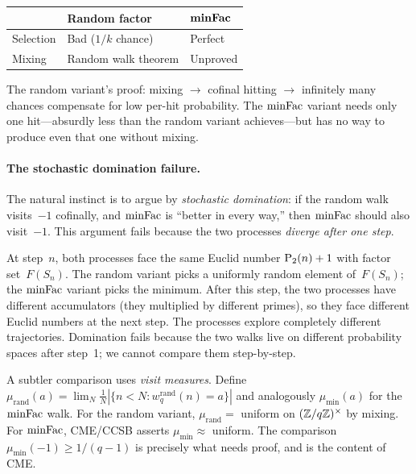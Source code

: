 \smallskip
\begin{center}
\begin{tabular}{l@{\quad}l@{\quad}l}
\toprule
 & \textbf{Random factor} & $\boldsymbol{\mathrm{minFac}}$ \\
\midrule
Selection & Bad ($1/k$ chance) & Perfect \\
Mixing & Random walk theorem & Unproved \\
\bottomrule
\end{tabular}
\end{center}

\smallskip\noindent
The random variant's proof: mixing $\to$ cofinal hitting $\to$
infinitely many chances compensate for low per-hit probability.
The $\mathrm{minFac}$ variant needs only one hit---absurdly less than the
random variant achieves---but has no way to produce even that one
without mixing.

\paragraph{The stochastic domination failure.}
\label{sec:stoch-dom}
The natural instinct is to argue by \emph{stochastic domination}:
if the random walk visits~$-1$ cofinally, and $\mathrm{minFac}$ is ``better
in every way,'' then $\mathrm{minFac}$ should also visit~$-1$.  This argument
fails because the two processes \emph{diverge after one step}.

At step~$n$, both processes face the same Euclid number
$\mathrm{P}_{2}(n)+1$ with factor set~$F(S_n)$.  The random variant picks a
uniformly random element of~$F(S_n)$; the $\mathrm{minFac}$ variant picks the
minimum.  After this step, the two processes have different
accumulators (they multiplied by different primes), so they face
different Euclid numbers at the next step.  The processes explore
completely different trajectories.  Domination fails because the
two walks live on different probability spaces after step~1; we
cannot compare them step-by-step.

A subtler comparison uses \emph{visit measures}.  Define
$\mu_{\mathrm{rand}}(a) = \lim_{N} \frac{1}{N}|\{n < N :
w_q^{\mathrm{rand}}(n) = a\}|$ and analogously
$\mu_{\min}(a)$ for the $\mathrm{minFac}$ walk.  For the random variant,
$\mu_{\mathrm{rand}} = $ uniform on $(\mathbb{Z}/q\mathbb{Z})^\times$ by mixing.
For $\mathrm{minFac}$, CME/CCSB asserts $\mu_{\min} \approx$ uniform.  The
comparison $\mu_{\min}(-1) \geq 1/(q{-}1)$ is precisely what needs
proof, and is the content of CME\@.

